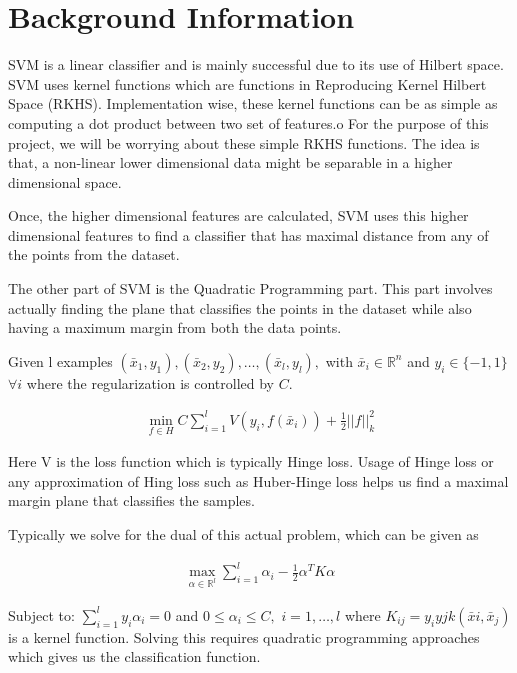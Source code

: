 \documentclass{article}
\begin{document}
\section{Background Information}

SVM is a linear classifier and is mainly successful due to its use of Hilbert space.  
SVM uses kernel functions which are functions in Reproducing Kernel Hilbert Space (RKHS).  
Implementation wise, these kernel functions can be as simple as computing a dot product between two set of features.o
For the purpose of this project, we will be worrying about these simple RKHS functions.
The idea is that, a non-linear lower dimensional data might be separable in a higher dimensional space.

Once, the higher dimensional features are calculated, SVM uses this higher dimensional features to find a classifier that has maximal distance from any of the points from the dataset.  

The other part of SVM is the Quadratic Programming part.  
This part involves actually finding the plane that classifies the points in the dataset while also having a maximum margin from both the data points.

Given l examples $(\bar{x}_{1}, y_{1}), (\bar{x}_{2}, y_{2}), \ldots ,(\bar{x}_{l}, y_{l}), $ with $\bar{x}_{i} \in \mathbb{R}^{n}$ and $y_{i} \in \{-1, 1\} $ $\forall{i} $ where the regularization is controlled by $C$.

\begin{align}
    \min_{f \in H} C\sum_{i = 1}^{l} V(y_{i}, f(\bar{x}_{i})) + \frac{1}{2} {\vert\vert f \vert\vert}_{k}^{2}
\end{align}

Here V is the loss function which is typically Hinge loss.  
Usage of Hinge loss or any approximation of Hing loss such as Huber-Hinge loss helps us find a maximal margin plane that classifies the samples.

Typically we solve for the dual of this actual problem, which can be given as

\begin{align}
    \max_{\alpha \in \mathbb{R}^{l}} \sum_{i = 1}^{l} \alpha_{i} - \frac{1}{2} \alpha^{T}K\alpha
\end{align}

Subject to: $\sum_{i=1}^{l} y_{i}\alpha_{i} = 0$ and $0 \le \alpha_{i} \le C, $ $ i = 1,\ldots,l $ where $K_{ij} = y_{i}y{j}k(\bar{x}{i}, \bar{x}_{j})$ is a kernel function. Solving this requires quadratic programming approaches which gives us the classification function.
\end{document}
